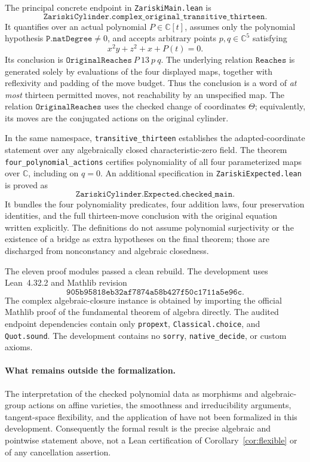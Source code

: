 \documentclass[11pt,letterpaper]{article}
\newcommand{\C}{\mathbb C}
\theoremstyle{remark}
\begin{document}
The principal concrete endpoint in \texttt{ZariskiMain.lean} is
\[
\texttt{ZariskiCylinder.complex\_original\_transitive\_thirteen}.
\]
It quantifies over an actual polynomial $P\in\C[t]$, assumes only the polynomial hypothesis $\texttt{P.natDegree}\ne0$, and accepts arbitrary points $p,q\in\C^5$ satisfying
\[
x^2y+z^2+x+P(t)=0.
\]
Its conclusion is $\texttt{OriginalReaches}\ P\ 13\ p\ q$. The underlying relation $\texttt{Reaches}$ is generated solely by evaluations of the four displayed maps, together with reflexivity and padding of the move budget. Thus the conclusion is a word of \emph{at most} thirteen permitted moves, not reachability by an unspecified map. The relation $\texttt{OriginalReaches}$ uses the checked change of coordinates $\Theta$; equivalently, its moves are the conjugated actions on the original cylinder.

In the same namespace, \texttt{transitive\_thirteen} establishes the adapted-coordinate statement over any algebraically closed characteristic-zero field. The theorem \texttt{four\_polynomial\_actions} certifies polynomiality of all four parameterized maps over $\C$, including on $q=0$. An additional specification in \texttt{ZariskiExpected.lean} is proved as
\[
\texttt{ZariskiCylinder.Expected.checked\_main}.
\]
It bundles the four polynomiality predicates, four addition laws, four preservation identities, and the full thirteen-move conclusion with the original equation written explicitly. The definitions do not assume polynomial surjectivity or the existence of a bridge as extra hypotheses on the final theorem; those are discharged from nonconstancy and algebraic closedness.

The eleven proof modules passed a clean rebuild. The development uses Lean~4.32.2 and Mathlib revision
\[
\texttt{905b95818eb32af7874a58b427f50c1711a5e96c}.
\]
The complex algebraic-closure instance is obtained by importing the official Mathlib proof of the fundamental theorem of algebra directly. The audited endpoint dependencies contain only \texttt{propext}, \texttt{Classical.choice}, and \texttt{Quot.sound}. The development contains no \texttt{sorry}, \texttt{native\_decide}, or custom axioms.

\paragraph{What remains outside the formalization.}
The interpretation of the checked polynomial data as morphisms and algebraic-group actions on affine varieties, the smoothness and irreducibility arguments, tangent-space flexibility, and the application of \cite{AFKKZ} have not been formalized in this development. Consequently the formal result is the precise algebraic and pointwise statement above, not a Lean certification of Corollary~\ref{cor:flexible} or of any cancellation assertion.
\end{document}
